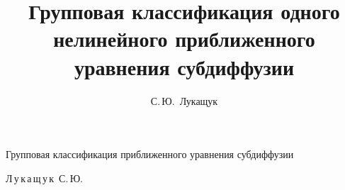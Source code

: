 


 

%

\usepackage{cite} 

\usepackage{enumitem}









\renewcommand{\firstpage}{1}

\renewcommand{\lastpage}{14}
















\title{Групповая классификация одного нелинейного приближенного уравнения субдиффузии}%

{Групповая классификация приближенного уравнения субдиффузии}%



\author{С.\,Ю.~Лукащук}%

{Л\,у\,к\,а\,щ\,у\,к~С.\,Ю.}%







